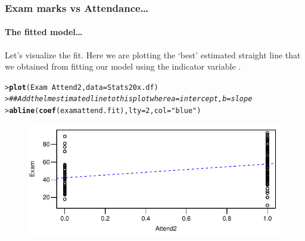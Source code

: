 \documentclass{beamer}\usepackage[]{graphicx}\usepackage[]{xcolor}
\makeatletter
\newcommand{\hlnum}[1]{\textcolor[rgb]{0.686,0.059,0.569}{#1}}%
\newcommand{\hlstr}[1]{\textcolor[rgb]{0.192,0.494,0.8}{#1}}%
\newcommand{\hlcom}[1]{\textcolor[rgb]{0.678,0.584,0.686}{\textit{#1}}}%
\newcommand{\hlopt}[1]{\textcolor[rgb]{0,0,0}{#1}}%
\newcommand{\hlstd}[1]{\textcolor[rgb]{0.345,0.345,0.345}{#1}}%
\newcommand{\hlkwc}[1]{\textcolor[rgb]{0.333,0.667,0.333}{#1}}%
\newcommand{\hlkwd}[1]{\textcolor[rgb]{0.737,0.353,0.396}{\textbf{#1}}}%
\newenvironment{kframe}{%
 \def\at@end@of@kframe{}%
 \ifinner\ifhmode%
  \def\at@end@of@kframe{\end{minipage}}%
  \begin{minipage}{\columnwidth}%
 \fi\fi%
 \def\FrameCommand##1{\hskip\@totalleftmargin \hskip-\fboxsep
 \colorbox{shadecolor}{##1}\hskip-\fboxsep
     \hskip-\linewidth \hskip-\@totalleftmargin \hskip\columnwidth}%
 \MakeFramed {\advance\hsize-\width
   \@totalleftmargin\z@ \linewidth\hsize
   \@setminipage}}%
 {\par\unskip\endMakeFramed%
 \at@end@of@kframe}
\newenvironment{knitrout}{}{} %
\makeatother
\begin{document}
\begin{frame}[fragile]
\frametitle{Exam marks vs Attendance\ldots}
\framesubtitle{The fitted model\ldots}
Let's visualize the fit. Here we are plotting the `best' estimated straight line that we obtained from fitting our model using the indicator variable .

\begin{knitrout}\scriptsize
{}\color{fgcolor}\begin{kframe}
\begin{alltt}
\hlstd{> }\hlkwd{plot}\hlstd{(Exam} \hlopt{~} \hlstd{Attend2,} \hlkwc{data} \hlstd{= Stats20x.df)}
\hlstd{> }\hlcom{## Add the lm estimated line to this  plot  where a=intercept, b=slope}
\hlstd{> }\hlkwd{abline}\hlstd{(}\hlkwd{coef}\hlstd{(examattend.fit),}\hlkwc{lty}\hlstd{=}\hlnum{2}\hlstd{,} \hlkwc{col}\hlstd{=}\hlstr{"blue"}\hlstd{)}
\end{alltt}
\end{kframe}
\end{knitrout}



\begin{figure}
  \centering
  \includegraphics{figure/RC-H05-013}
\end{figure}

\end{frame}
\end{document}
